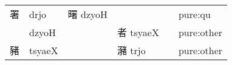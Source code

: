 \documentclass[14pt,a4paper]{scrartcl}
\begin{document}
\begin{longtable}[c]{@{}llllll@{}}
\begin{minipage}[t]{0.14\columnwidth}
署
\strut\end{minipage} &
\begin{minipage}[t]{0.14\columnwidth}\raggedright\strut
drjo
\strut\end{minipage} &
\begin{minipage}[t]{0.14\columnwidth}\raggedright\strut
曙 dzyoH
\strut\end{minipage} &
\begin{minipage}[t]{0.14\columnwidth}\raggedright\strut
\strut\end{minipage} &
\begin{minipage}[t]{0.14\columnwidth}\raggedright\strut
\strut\end{minipage} &
\begin{minipage}[t]{0.14\columnwidth}\raggedright\strut
pure:qu
\strut\end{minipage}\tabularnewline
\begin{minipage}[t]{0.14\columnwidth}\raggedright\strut
𣥏
\strut\end{minipage} &
\begin{minipage}[t]{0.14\columnwidth}\raggedright\strut
dzyoH
\strut\end{minipage} &
\begin{minipage}[t]{0.14\columnwidth}\raggedright\strut
\strut\end{minipage} &
\begin{minipage}[t]{0.14\columnwidth}\raggedright\strut
者 tsyaeX
\strut\end{minipage} &
\begin{minipage}[t]{0.14\columnwidth}\raggedright\strut
\strut\end{minipage} &
\begin{minipage}[t]{0.14\columnwidth}\raggedright\strut
pure:other
\strut\end{minipage}\tabularnewline
\begin{minipage}[t]{0.14\columnwidth}\raggedright\strut
豬
\strut\end{minipage} &
\begin{minipage}[t]{0.14\columnwidth}\raggedright\strut
tsyaeX
\strut\end{minipage} &
\begin{minipage}[t]{0.14\columnwidth}\raggedright\strut
\strut\end{minipage} &
\begin{minipage}[t]{0.14\columnwidth}\raggedright\strut
瀦 trjo
\strut\end{minipage} &
\begin{minipage}[t]{0.14\columnwidth}\raggedright\strut
\strut\end{minipage} &
\begin{minipage}[t]{0.14\columnwidth}\raggedright\strut
pure:other
\strut\end{minipage}\tabularnewline
\bottomrule
\end{longtable}
\end{document}
